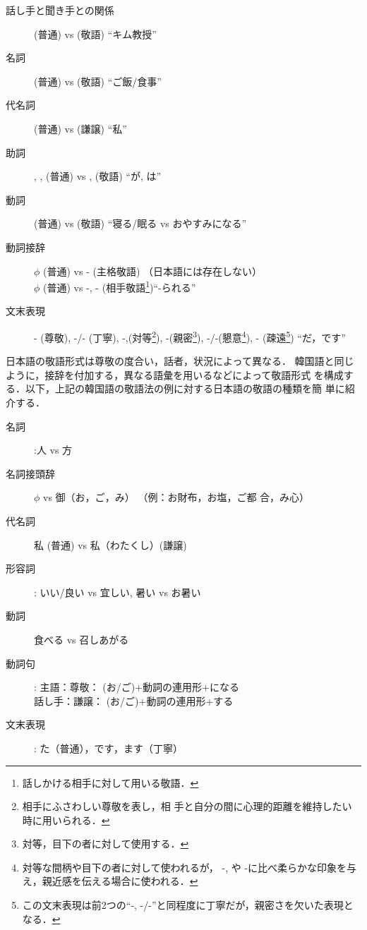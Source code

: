 \begin{description}
 \item[話し手と聞き手との関係]  (普通) vs  (敬語) ``キム教授''
 \item[名詞]   (普通) vs  (敬語) ``ご飯/食事''
 \item[代名詞]   (普通) vs  (謙譲) ``私''
 \item[助詞]  , ,   (普通) vs ,  (敬語) ``が, は''
 \item[動詞]   (普通) vs  (敬語) ``寝る/眠る vs
おやすみになる''
 \item[動詞接辞]  $\phi$ (普通) vs - (主格敬語) （日本語には存在しない）\\
                       $\phi$ (普通) vs -, - (相手敬語\footnote{話しかける相手に対して用いる敬語．})``-られる''
\item[文末表現]  - (尊敬), -/-
  (丁寧), -,(対等\footnote{相手にふさわしい尊敬を表し，相
	    手と自分の間に心理的距離を維持したい時に用いられる．}),
-(親密\footnote{対等，目下の者に対して使用する．}), 
-/-(懇意\footnote{対等な間柄や目下の者に対して使われるが，
-, や -に比べ柔らかな印象を与え，親近感を伝える場合に使われる．}), 
- (疎遠\footnote{この文末表現は前2つの``-, 
-/-''と同程度に丁寧だが，親密さを欠いた表現となる．}) ``だ，です''
\end{description}

日本語の敬語形式は尊敬の度合い，話者，状況によって異なる．
韓国語と同じように，接辞を付加する，異なる語彙を用いるなどによって敬語形式
を構成する．以下，上記の韓国語の敬語法の例に対する日本語の敬語の種類を簡
単に紹介する\cite{Kaiser:2001}．

\begin{description}
\item[名詞]:人 vs 方
\item[名詞接頭辞]  $\phi$ vs 御（お，ご，み） （例：お財布，お塩，ご都
合，み心）
 \item[代名詞]  私 (普通) vs 私（わたくし）(謙譲)
\item[形容詞]: いい/良い vs 宜しい, 暑い vs お暑い
 \item[動詞]  食べる vs 召しあがる
\item[動詞句]: 主語：尊敬： (お/ご)+動詞の連用形+になる\\
              話し手：謙譲： (お/ご)+動詞の連用形+する 
\item[文末表現]: た（普通），です，ます（丁寧）
 \end{description}

